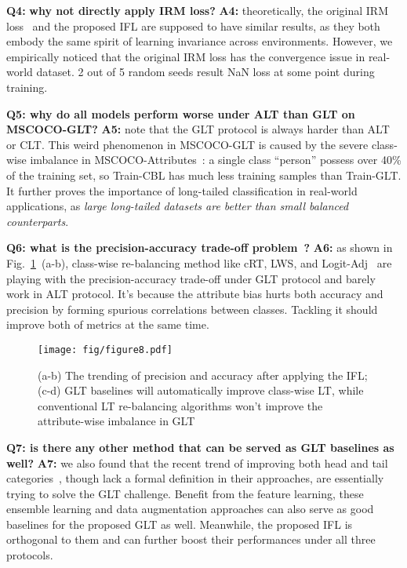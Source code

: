\documentclass{article}
\begin{document}
\noindent\textbf{Q4:} \textbf{why not directly apply IRM loss?} \textbf{A4:} theoretically, the original IRM loss~\cite{arjovsky2019invariant} and the proposed IFL are supposed to have similar results, as they both embody the same spirit of learning invariance across environments. However, we empirically noticed that the original IRM loss has the convergence issue in real-world dataset. 2 out of 5 random seeds result NaN loss at some point during training.

\noindent\textbf{Q5: why do all models perform worse under ALT than GLT on MSCOCO-GLT?} \textbf{A5: } note that the GLT protocol is always harder than ALT or CLT. This weird phenomenon in MSCOCO-GLT is caused by the severe class-wise imbalance in MSCOCO-Attributes~\cite{patterson2016coco}: a single class ``person'' possess over 40\% of the training set, so Train-CBL has much less training samples than Train-GLT. It further proves the importance of long-tailed classification in real-world applications, as \textit{large long-tailed datasets are better than small balanced counterparts}. 





\noindent\textbf{Q6: what is the precision-accuracy trade-off problem~\cite{zhu2021cross}?} \textbf{A6:} as shown in Fig.~\ref{fig:8}~(a-b), class-wise re-balancing method like cRT, LWS, and Logit-Adj~\cite{kang2019decoupling,menon2020long} are playing with the precision-accuracy trade-off under GLT protocol and barely work in ALT protocol. It's because the attribute bias hurts both accuracy and precision by forming spurious correlations between classes. Tackling it should improve both of metrics at the same time.






\begin{figure}
  \texttt{[image: fig/figure8.pdf]}
  \caption{(a-b) The trending of precision and accuracy after applying the IFL; (c-d) GLT baselines will automatically improve class-wise LT, while conventional LT re-balancing algorithms won't improve the attribute-wise imbalance in GLT}
\label{fig:8}
\end{figure}










\noindent\textbf{Q7: is there any other method that can be served as GLT baselines as well?} \textbf{A7:} we also found that the recent trend of improving both head and tail categories~\cite{wang2020long,zhang2021test,zhu2021cross}, though lack a formal definition in their approaches, are essentially trying to solve the GLT challenge. Benefit from the feature learning, these ensemble learning and data augmentation approaches can also serve as good baselines for the proposed GLT as well. Meanwhile, the proposed IFL is orthogonal to them and can further boost their performances under all three protocols.
\end{document}
